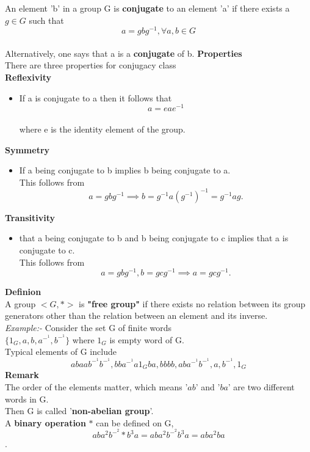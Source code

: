 \documentclass[12pt]{article}
\begin{document}
       \vspace{2mm}
    An element 'b' in a group G is \textbf{conjugate} to an element 'a' if there exists a $g\in G$ such that $$a = gbg^{-1}, \forall a,b \in G$$ \\
    Alternatively, one says that a is a \textbf{conjugate} of b.
    \textbf{Properties}\\
    There are three properties for conjugacy class\\
    \vspace{2mm}
    \textbf{Reflexivity}\\
    \begin{itemize}
        \item If a is conjugate to a then it follows that\\
    $$a=eae^{-1}$$\\ where e is the identity element of the group.
    \end{itemize}
    
     \textbf{Symmetry}\\
    \begin{itemize}
        \item If a being conjugate to b implies b being conjugate to a.\\
        This follows from 
        $$ a=gbg^{-1} \implies b=g^{-1}a(g^{-1})^{-1}=g^{-1}ag .$$
    \end{itemize}
    \textbf{Transitivity}\\
    \begin{itemize}
        \item that a being conjugate to b and b being conjugate to c implies that a is conjugate to c. \\
        This follows from \\
        $$a=gbg^{-1}, b=gcg^{-1} \implies a=gcg^{-1} .$$
     \end{itemize}
     \textbf{Definion}\\
     A group $<G,*>$ is \textbf{"free group"} if there exists no relation between its group generators other than the relation between an element and its inverse.\\
     \vspace{2mm}
    \textit{Example:-} Consider the set G of finite words\\
    $\{1_G,a,b,a^-^1,b^-^1\}$ where $1_G$ is empty word of G.\\

    Typical elements of G include
     $$abaab^-^1b^-^1, bba^-^1a1_Gba,bbbb,aba^-^1b^-^1,a,b^-^1,1_G$$
     \textbf{Remark}\\
     The order of the elements matter, which means '$ab$' and '$ba$' are two different words in G.\\ 
     Then G is called '\textbf{non-abelian group}'.\\
     \vspace{3mm}
     A \textbf{binary operation} $*$ can be defined on G,\\
     $$aba^2b^-^2*b^3a=aba^2b^-^2b^3a=aba^2ba$$.
     
\end{document}
